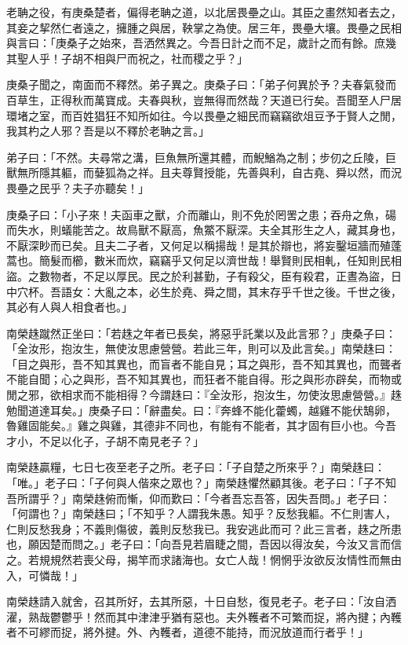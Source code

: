 
\begin{pinyinscope}
老聃之役，有庚桑楚者，偏得老聃之道，以北居畏壘之山。其臣之畫然知者去之，其妾之挈然仁者遠之，擁腫之與居，鞅掌之為使。居三年，畏壘大壤。畏壘之民相與言曰：「庚桑子之始來，吾洒然異之。今吾日計之而不足，歲計之而有餘。庶幾其聖人乎！子胡不相與尸而祝之，社而稷之乎？」

庚桑子聞之，南面而不釋然。弟子異之。庚桑子曰：「弟子何異於予？夫春氣發而百草生，正得秋而萬寶成。夫春與秋，豈無得而然哉？天道已行矣。吾聞至人尸居環堵之室，而百姓猖狂不知所如往。今以畏壘之細民而竊竊欲俎豆予于賢人之閒，我其杓之人邪？吾是以不釋於老聃之言。」

弟子曰：「不然。夫尋常之溝，巨魚無所還其體，而鯢鰌為之制；步仞之丘陵，巨獸無所隱其軀，而㜸狐為之祥。且夫尊賢授能，先善與利，自古堯、舜以然，而況畏壘之民乎？夫子亦聽矣！」

庚桑子曰：「小子來！夫函車之獸，介而離山，則不免於罔罟之患；吞舟之魚，碭而失水，則蟻能苦之。故鳥獸不厭高，魚鱉不厭深。夫全其形生之人，藏其身也，不厭深眇而已矣。且夫二子者，又何足以稱揚哉！是其於辯也，將妄鑿垣牆而殖蓬蒿也。簡髮而櫛，數米而炊，竊竊乎又何足以濟世哉！舉賢則民相軋，任知則民相盜。之數物者，不足以厚民。民之於利甚勤，子有殺父，臣有殺君，正晝為盜，日中穴杯。吾語女：大亂之本，必生於堯、舜之間，其末存乎千世之後。千世之後，其必有人與人相食者也。」

南榮趎蹴然正坐曰：「若趎之年者已長矣，將惡乎託業以及此言邪？」庚桑子曰：「全汝形，抱汝生，無使汝思慮營營。若此三年，則可以及此言矣。」南榮趎曰：「目之與形，吾不知其異也，而盲者不能自見；耳之與形，吾不知其異也，而聾者不能自聞；心之與形，吾不知其異也，而狂者不能自得。形之與形亦辟矣，而物或閒之邪，欲相求而不能相得？今謂趎曰：『全汝形，抱汝生，勿使汝思慮營營。』趎勉聞道達耳矣。」庚桑子曰：「辭盡矣。曰：『奔蜂不能化藿蠋，越雞不能伏鵠卵，魯雞固能矣。』雞之與雞，其德非不同也，有能有不能者，其才固有巨小也。今吾才小，不足以化子，子胡不南見老子？」

南榮趎贏糧，七日七夜至老子之所。老子曰：「子自楚之所來乎？」南榮趎曰：「唯。」老子曰：「子何與人偕來之眾也？」南榮趎懼然顧其後。老子曰：「子不知吾所謂乎？」南榮趎俯而慚，仰而歎曰：「今者吾忘吾答，因失吾問。」老子曰：「何謂也？」南榮趎曰；「不知乎？人謂我朱愚。知乎？反愁我軀。不仁則害人，仁則反愁我身；不義則傷彼，義則反愁我已。我安逃此而可？此三言者，趎之所患也，願因楚而問之。」老子曰：「向吾見若眉睫之間，吾因以得汝矣，今汝又言而信之。若規規然若喪父母，揭竿而求諸海也。女亡人哉！惘惘乎汝欲反汝情性而無由入，可憐哉！」

南榮趎請入就舍，召其所好，去其所惡，十日自愁，復見老子。老子曰：「汝自洒濯，熟哉鬱鬱乎！然而其中津津乎猶有惡也。夫外韄者不可繁而捉，將內揵；內韄者不可繆而捉，將外揵。外、內韄者，道德不能持，而況放道而行者乎！」


\end{pinyinscope}
